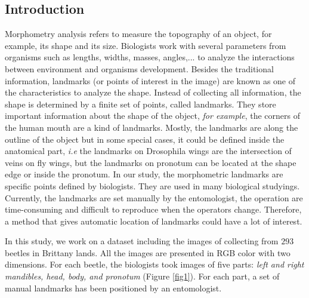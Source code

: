 \documentclass{article} %
\begin{document}
\begin{multicols}{2}



\section{ Introduction}
Morphometry analysis refers to measure the topography of an object, for example, its shape and its size. Biologists work with several parameters from organisms such as lengths, widths, masses, angles,... to analyze the interactions between environment and organisms development. Besides the traditional information, landmarks (or points of interest in the image) are known as one of the characteristics to analyze the shape. Instead of collecting all information, the shape is determined by a finite set of points, called landmarks. They store important information about the shape of the object, \textit{for example}, the corners of the human mouth are a kind of landmarks. Mostly, the landmarks are along the outline of the object but in some special cases, it could be defined inside the anatomical part, \textit{i.e} the landmarks on Drosophila wings are the intersection of veins on fly wings, but the landmarks on pronotum can be located at the shape edge or inside the pronotum. In our study, the morphometric landmarks are specific points defined by biologists. They are used in many biological studyings. Currently, the landmarks are set manually by the entomologist, the operation are time-consuming and difficult to reproduce when the operators change. Therefore, a method that gives automatic location of landmarks could have a lot of interest.

In this study, we work on a dataset including the images of collecting from $293$ beetles in Brittany lands. All the images are presented in RGB color with two dimensions. For each beetle, the biologists took images of five parts: \textit{left and right mandibles, head, body, and pronotum} (Figure \ref{fig1}). For each part, a set of manual landmarks has been positioned by an entomologist.


\end{multicols}
\end{document}
